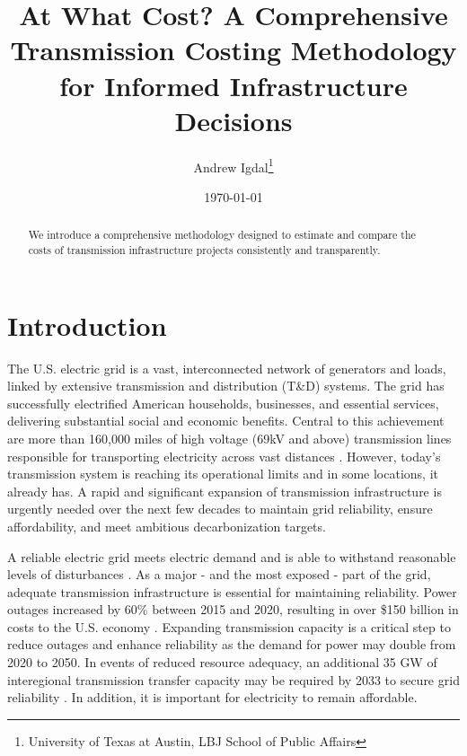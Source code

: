 \documentclass[11pt,twocolumn,a4paper]{article}
\title{At What Cost? A Comprehensive Transmission Costing Methodology for Informed Infrastructure Decisions}
\author{
  Andrew Igdal\thanks{University of Texas at Austin, LBJ School of Public Affairs} \\
}
\date{\today}
\begin{document}
\maketitle

\begin{abstract}
We introduce a comprehensive methodology designed to estimate and compare the costs of transmission infrastructure projects consistently and transparently.
\end{abstract}

\section{Introduction}

The U.S. electric grid is a vast, interconnected network of generators and loads, linked by extensive transmission and distribution (T\&D) systems. The grid has successfully electrified American households, businesses, and essential services, delivering substantial social and economic benefits. Central to this achievement are more than 160,000 miles of high voltage (69kV and above) transmission lines responsible for transporting electricity across vast distances \parencite{EIA2021Interconnections, OSHATransmissionDistribution2025}. However, today's transmission system is reaching its operational limits and in some locations, it already has. A rapid and significant expansion of transmission infrastructure is urgently needed over the next few decades to maintain grid reliability, ensure affordability, and meet ambitious  decarbonization targets.

A reliable electric grid meets electric demand and is able to withstand reasonable levels of disturbances  \parencite{ReliabilityExplainerFederal}. As a major - and the most exposed - part of the grid, adequate transmission infrastructure is essential for maintaining reliability. Power outages increased by 60\% between 2015 and 2020, resulting in over \$150 billion in costs to the U.S. economy \parencite{stoneCompoundClimateInfrastructure2021,CleanCheapterStrongerPEW}. Expanding transmission capacity is a critical step to reduce outages and enhance reliability \parencite{lawsonVariableRenewableEnergy} as the demand for power may double from 2020 to 2050\parencite{NationalTransmissionNeeds2023}. In events of reduced resource adequacy, an additional 35 GW of interegional transmission transfer capacity may be required by 2033 to secure grid reliability  \parencite{nercITCS2024}. In addition, it is important for electricity to remain affordable.
\end{document}
